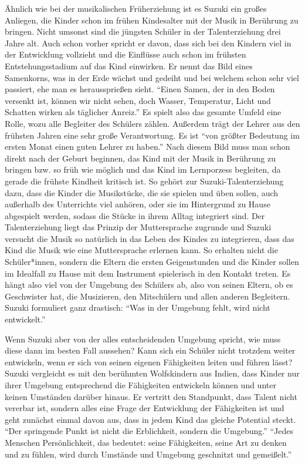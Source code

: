 Ähnlich wie bei der musikalischen Früherziehung ist es Suzuki ein großes
Anliegen, die Kinder schon im frühen Kindesalter mit der Musik in Berührung zu
bringen. Nicht umsonst sind die jüngsten Schüler in der Talenterziehung drei
Jahre alt. Auch schon vorher spricht er davon, dass sich bei den Kindern viel in
der Entwicklung vollzieht und die Einflüsse auch schon im frühsten
Entstehungsstadium auf das Kind einwirken. Er nennt das Bild eines Samenkorns,
was in der Erde wächst und gedeiht und bei welchem schon sehr viel passiert, ehe
man es heraussprießen sieht. \enquote{Einen Samen, der in den Boden versenkt
ist, können wir nicht sehen, doch Wasser, Temperatur, Licht und Schatten wirken
als täglicher Anreiz.}\autocite[17]{suzuki:erziehung_ist_liebe} Es spielt also
das gesamte Umfeld eine Rolle, wozu alle Begleiter des Schülers zählen. Außerdem
trägt der Lehrer aus den frühsten Jahren eine sehr große Verantwortung. Es ist
\enquote{von größter Bedeutung im ersten Monat einen guten Lehrer zu haben.}
\autocite[21]{suzuki:erziehung_ist_liebe} Nach diesem Bild muss man schon direkt
nach der Geburt beginnen, das Kind mit der Musik in Berührung zu bringen bzw. so
früh wie möglich und das Kind im Lernporzess begleiten, da gerade die frühste
Kindheit kritisch ist. \autocite[25]{suzuki:erziehung_ist_liebe} So gehört zur
Suzuki-Talenterziehung dazu, dass die Kinder die Musikstücke, die sie spielen
und üben sollen, auch außerhalb des Unterrichts viel anhören, oder sie im
Hintergrund zu Hause abgespielt werden, sodass die Stücke in ihrem Alltag
integriert sind. Der Talenterziehung liegt das Prinzip der Muttersprache
zugrunde und Suzuki versucht die Musik so natürlich in das Leben des Kindes zu
integrieren, dass das Kind die Musik wie eine Muttersprache erlernen kann.  So
erhalten nicht die Schüler*innen, sondern die Eltern die ersten Geigenstunden
und die Kinder sollen im Idealfall zu Hause mit dem Instrument spielerisch in
den Kontakt treten. \autocite[75]{suzuki:erziehung_ist_liebe} Es hängt also viel
von der Umgebung des Schülers ab, also von seinen Eltern, ob es Geschwister hat,
die Musizieren, den Mitschülern und allen anderen Begleitern. Suzuki formuliert
ganz drastisch: \enquote{Was in der Umgebung fehlt, wird nicht entwickelt.}
\autocite[25]{suzuki:erziehung_ist_liebe}

Wenn Suzuki aber von der alles entscheidenden Umgebung spricht, wie muss diese
dann im besten Fall aussehen? Kann sich ein Schüler nicht trotzdem weiter
entwickeln, wenn er sich von seinen eigenen Fähigkeiten leiten und führen lässt?
Suzuki vergleicht es mit den berühmten Wolfskindern aus Indien, dass Kinder nur
ihrer Umgebung entsprechend die Fähigkeiten entwickeln können und unter keinen
Umständen darüber hinaus. \autocite[24]{suzuki:erziehung_ist_liebe} Er vertritt
den Standpunkt, dass Talent nicht vererbar ist, sondern alles eine Frage der
Entwicklung der Fähigkeiten ist und geht zunächst einmal davon aus, dass in
jedem Kind das gleiche Potential steckt. \enquote{Der springende Punkt ist nicht
die Erblichkeit, sondern die Umgebung.}
\autocite[24]{suzuki:erziehung_ist_liebe} \enquote{Jedes Menschen
Persönlichkeit, das bedeutet: seine Fähigkeiten, seine Art zu denken und zu
fühlen, wird durch Umstände und Umgebung geschnitzt und gemeißelt.}
\autocite[20]{suzuki:erziehung_ist_liebe}

